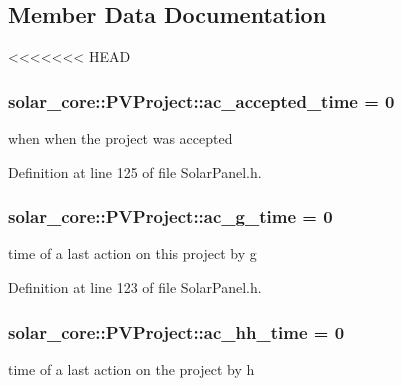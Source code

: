 \subsection{Member Data Documentation}
\hypertarget{classsolar__core_1_1_p_v_project_a1affdb487e749b689fe2bcbd9c79613c}{}
<<<<<<< HEAD
\subsubsection[{ac\+\_\+accepted\+\_\+time}]{ solar\+\_\+core\+::\+P\+V\+Project\+::ac\+\_\+accepted\+\_\+time = 0}\label{classsolar__core_1_1_p_v_project_a1affdb487e749b689fe2bcbd9c79613c}
when when the project was accepted 

Definition at line 125 of file Solar\+Panel.\+h.

\hypertarget{classsolar__core_1_1_p_v_project_a9be23309024672b4be445f68c73e42a6}{}
\subsubsection[{ac\+\_\+g\+\_\+time}]{ solar\+\_\+core\+::\+P\+V\+Project\+::ac\+\_\+g\+\_\+time = 0}\label{classsolar__core_1_1_p_v_project_a9be23309024672b4be445f68c73e42a6}
time of a last action on this project by g 

Definition at line 123 of file Solar\+Panel.\+h.

\hypertarget{classsolar__core_1_1_p_v_project_ab6196935ca6f777b28a944642efdbf84}{}
\subsubsection[{ac\+\_\+hh\+\_\+time}]{ solar\+\_\+core\+::\+P\+V\+Project\+::ac\+\_\+hh\+\_\+time = 0}\label{classsolar__core_1_1_p_v_project_ab6196935ca6f777b28a944642efdbf84}
time of a last action on the project by h 

